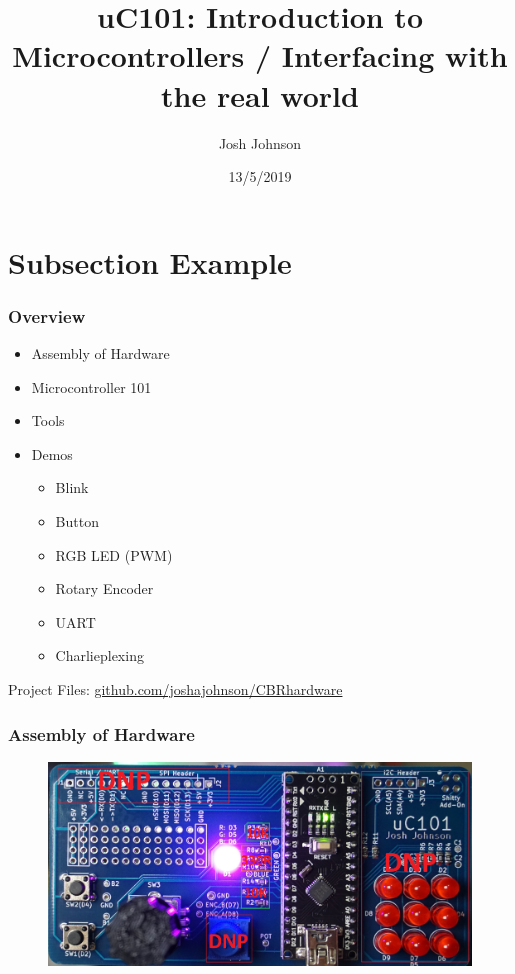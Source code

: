 \documentclass[t]{beamer}
\title[uC101]{uC101: Introduction to Microcontrollers / Interfacing with the real world} %
\author{Josh Johnson} %
\institute[] %
{ \\ %
\medskip
\textit{} %
}
\date{13/5/2019} %
\begin{document}
\begin{frame}
\titlepage %
\end{frame}


\section{Subsection Example} %

\begin{frame}
\frametitle{Overview}
\begin{itemize}
\item Assembly of Hardware
\item Microcontroller 101
\item Tools
\item Demos
\begin{itemize}
	\item Blink
	\item Button
	\item RGB LED (PWM)
	\item Rotary Encoder
	\item UART
	\item Charlieplexing
\end{itemize}
	

\end{itemize}
\vspace{20mm}
Project Files: \url{github.com/joshajohnson/CBRhardware}\\
\end{frame}


\begin{frame}[t]
\frametitle{Assembly of Hardware}

\begin{figure}
	\includegraphics[width=1\linewidth]{hardware.jpg}
\end{figure}

\end{frame}
\end{document}
